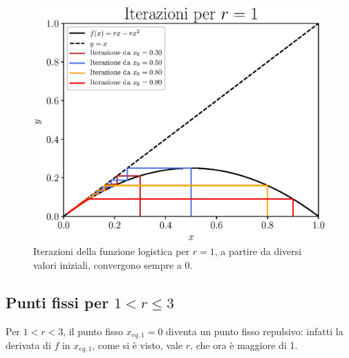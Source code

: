 \begin{figure}[h!]
    \begin{center}  
    \includegraphics[scale=0.7]{Immagini/iterazioni_r1.eps} 
    \captionsetup{width=.8\linewidth}
    \caption{Iterazioni della funzione logistica per $r=1$, a partire da diversi valori iniziali, convergono sempre a 0.}
    \label{fig:r1}
    \end{center}   
\end{figure}

\subsection{Punti fissi per $1 < r \leq 3$}
Per $1 < r < 3$, il punto fisso $x_{eq,1} = 0$ diventa un punto fisso repulsivo: infatti la derivata di $f$ in $x_{eq,1}$, come si è visto, vale $r$, che ora è maggiore di 1.

